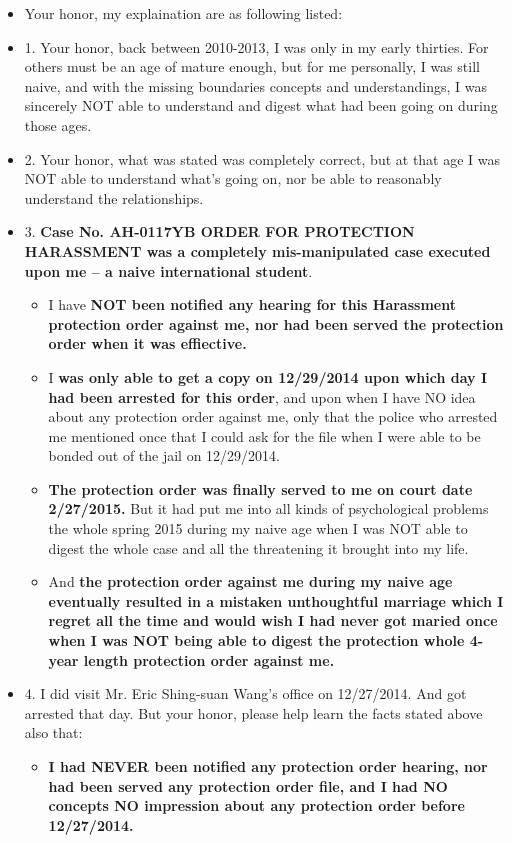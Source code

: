 \documentclass[9pt, b5paper]{article}
\begin{document}
\begin{itemize}
\item Your honor, my explaination are as following listed:
\item 1. Your honor, back between 2010-2013, I was only in my early thirties. For others must be an age of mature enough, but for me personally, I was still naive, and with the missing boundaries concepts and understandings, I was sincerely NOT able to understand and digest what had been going on during those ages.
\item 2. Your honor, what was stated was completely correct, but at that age I was NOT able to understand what's going on, nor be able to reasonably understand the relationships.
\item 3. \textbf{Case No. AH-0117YB ORDER FOR PROTECTION HARASSMENT was a completely mis-manipulated case executed upon me -- a naive international student}. 
\begin{itemize}
\item I have \textbf{NOT been notified any hearing for this Harassment protection order against me, nor had been served the protection order when it was effiective.}
\item I \textbf{was only able to get a copy on 12/29/2014 upon which day I had been arrested for this order}, and upon when I have NO idea about any protection order against me, only that the police who arrested me mentioned once that I could ask for the file when I were able to be bonded out of the jail on 12/29/2014.
\item \textbf{The protection order was finally served to me on court date 2/27/2015.} But it had put me into all kinds of psychological problems the whole spring 2015 during my naive age when I was NOT able to digest the whole case and all the threatening it brought into my life.
\item And \textbf{the protection order against me during my naive age eventually resulted in a mistaken unthoughtful marriage which I regret all the time and would wish I had never got maried once when I was NOT being able to digest the protection whole 4-year length protection order against me.}
\end{itemize}
\item 4. I did visit Mr. Eric Shing-suan Wang's office on 12/27/2014. And got arrested that day. But your honor, please help learn the facts stated above also that: 
\begin{itemize}
\item \textbf{I had NEVER been notified any protection order hearing, nor had been served any protection order file, and I had NO concepts NO impression about any protection order before 12/27/2014.}

\end{itemize}
\end{itemize}
\end{document}
